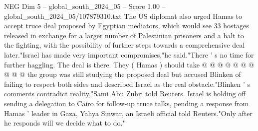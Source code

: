 \begin{textsample}{NEG Dim 5 – global\_south\_2024\_05 – Score 1.00 – global\_south\_2024\_05/107879310.txt}
The US diplomat also urged Hamas to accept truce deal proposed by Egyptian mediators, which would see 33 hostages released in exchange for a larger number of Palestinian prisoners and a halt to the fighting, with the possibility of further steps towards a comprehensive deal later."Israel has made very important compromises,"he said."There ' s no time for further haggling.
The deal is there.
They ( Hamas ) should take @ @ @ @ @ @ @ @ @ @ the group was still studying the proposed deal but accused Blinken of failing to respect both sides and described Israel as the real obstacle."Blinken ' s comments contradict reality,"Sami Abu Zuhri told Reuters.
Israel is holding off sending a delegation to Cairo for follow-up truce talks, pending a response from Hamas ' leader in Gaza, Yahya Sinwar, an Israeli official told Reuters."Only after he responds will we decide what to do."

\end{textsample}
